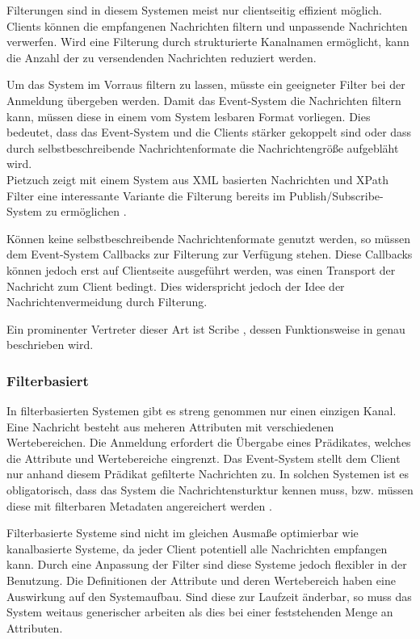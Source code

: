 Filterungen sind in diesem Systemen meist nur clientseitig effizient möglich. Clients können die empfangenen Nachrichten filtern und unpassende Nachrichten verwerfen. Wird eine Filterung durch strukturierte Kanalnamen ermöglicht, kann die Anzahl der zu versendenden Nachrichten reduziert werden.

Um das System im Vorraus filtern zu lassen, müsste ein geeigneter Filter bei der Anmeldung übergeben werden. Damit das Event-System die Nachrichten filtern kann, müssen diese in einem vom System lesbaren Format vorliegen. Dies bedeutet, dass das Event-System und die Clients stärker gekoppelt sind oder dass durch selbstbeschreibende Nachrichtenformate die Nachrichtengröße aufgebläht wird.\\
Pietzuch zeigt mit einem System aus XML basierten Nachrichten und XPath Filter eine interessante Variante die Filterung bereits im Publish/Subscribe-System zu ermöglichen \cite{PiEyKoSh2007-PubSubAPI}.

Können keine selbstbeschreibende Nachrichtenformate genutzt werden, so müssen dem Event-System Callbacks zur Filterung zur Verfügung stehen. Diese Callbacks können jedoch erst auf Clientseite ausgeführt werden, was einen Transport der Nachricht zum Client bedingt. Dies widerspricht jedoch der Idee der Nachrichtenvermeidung durch Filterung.

Ein prominenter Vertreter dieser Art ist Scribe \cite{Castro2002Scribe}, dessen Funktionsweise in  genau beschrieben wird.

\subsubsection{Filterbasiert}
\label{chap:grundlagen:pubsub:filterbased}
In filterbasierten Systemen gibt es streng genommen nur einen einzigen Kanal. Eine Nachricht besteht aus meheren Attributen mit verschiedenen Wertebereichen. Die Anmeldung erfordert die Übergabe eines Prädikates, welches die Attribute und Wertebereiche eingrenzt. Das Event-System stellt dem Client nur anhand diesem Prädikat gefilterte Nachrichten zu. In solchen Systemen ist es obligatorisch, dass das System die Nachrichtensturktur kennen muss, bzw. müssen diese mit filterbaren Metadaten angereichert werden \cite{PiEyKoSh2007-PubSubAPI}.

Filterbasierte Systeme sind nicht im gleichen Ausmaße optimierbar wie kanalbasierte Systeme, da jeder Client potentiell alle Nachrichten empfangen kann. Durch eine Anpassung der Filter sind diese Systeme jedoch flexibler in der Benutzung. Die Definitionen der Attribute und deren Wertebereich haben eine Auswirkung auf den Systemaufbau. Sind diese zur Laufzeit änderbar, so muss das System weitaus generischer arbeiten als dies bei einer feststehenden Menge an Attributen.

